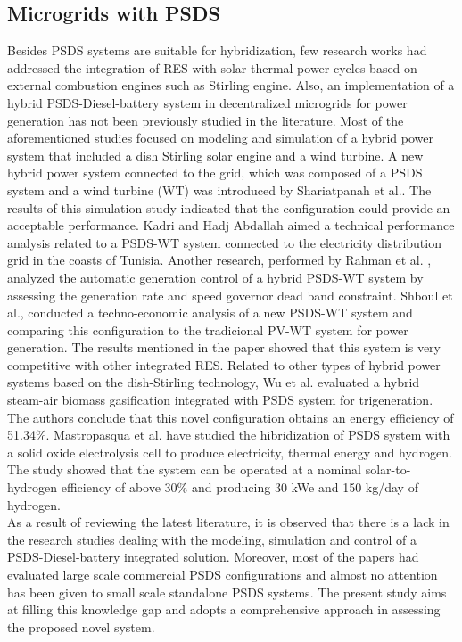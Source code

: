 \documentclass{ECOS_2019}
\begin{document}
\subsection{Microgrids with PSDS}
Besides PSDS systems are suitable for hybridization\cite{Guo2018}, few research works had addressed the integration of RES with solar thermal power cycles based on external combustion engines such as Stirling engine. Also, an implementation of a hybrid PSDS-Diesel-battery system in decentralized microgrids for power generation has not been previously studied in the literature. Most of the aforementioned studies focused on modeling and simulation of a hybrid power system that included a dish Stirling solar engine and a wind turbine. A new hybrid power system connected to the grid, which was composed of a PSDS system and a wind turbine (WT) was introduced by Shariatpanah et al.\cite{Shariatpanah2013}. The results of this simulation study indicated that the configuration could provide an acceptable performance. Kadri and Hadj Abdallah aimed a technical performance analysis related to a PSDS-WT system connected to the electricity distribution grid in the coasts of Tunisia\cite{Kadri2016}. Another research, performed by Rahman et al. \cite{Rahman2017}, analyzed the automatic generation control of a hybrid PSDS-WT system by assessing the generation rate and speed governor dead band constraint. Shboul et al.\cite{Shboul2021}, conducted a techno-economic analysis of a new PSDS-WT system and comparing this configuration to the tradicional PV-WT system for power generation. The results mentioned in the paper showed that this system is very competitive with other integrated RES. Related to other types of hybrid power systems based on the dish-Stirling technology, Wu et al. \cite{Wu2020} evaluated a hybrid steam-air biomass gasification integrated with PSDS system for trigeneration. The authors conclude that this novel configuration obtains an energy efficiency of 51.34\%. Mastropasqua et al. \cite{Mastropasqua2020} have studied the hibridization of PSDS system with a solid oxide electrolysis cell to produce electricity, thermal energy and hydrogen. The study showed that the system can be operated at a nominal solar-to-hydrogen efficiency of above 30\% and producing 30 kWe and 150 kg/day of hydrogen.
\\

As a result of reviewing the latest literature, it is observed that there is a lack in the research studies dealing with the modeling, simulation and control of a PSDS-Diesel-battery integrated solution. Moreover, most of the papers had evaluated large scale commercial PSDS configurations and almost no attention has been given to small scale standalone PSDS systems\cite{Lashari2021}. The present study aims at filling this knowledge gap and adopts a comprehensive approach in assessing the proposed novel system.
\end{document}
